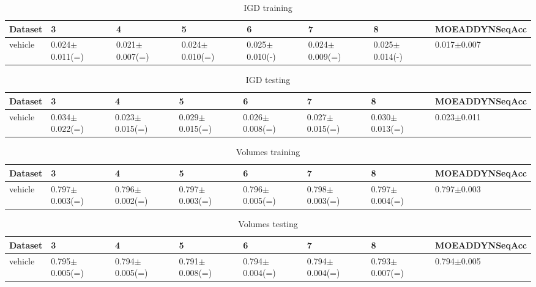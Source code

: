 \documentclass{report}
\begin{document}
\begin{table}
\centering
\scriptsize
\begin{tabular}{llllllll}
\\\hline
Dataset & 3 & 4 & 5 & 6 & 7 & 8 & MOEADDYNSeqAcc\\\hline
vehicle & 0.024$\pm$0.011(=) & 0.021$\pm$0.007(=) & 0.024$\pm$0.010(=) & 0.025$\pm$0.010(-) & 0.024$\pm$0.009(=) & 0.025$\pm$0.014(-) & 0.017$\pm$0.007\\\hline
\end{tabular}
\caption{IGD training}
\end{table}

\begin{table}
\centering
\scriptsize
\begin{tabular}{llllllll}
\\\hline
Dataset & 3 & 4 & 5 & 6 & 7 & 8 & MOEADDYNSeqAcc\\\hline
vehicle & 0.034$\pm$0.022(=) & 0.023$\pm$0.015(=) & 0.029$\pm$0.015(=) & 0.026$\pm$0.008(=) & 0.027$\pm$0.015(=) & 0.030$\pm$0.013(=) & 0.023$\pm$0.011\\\hline
\end{tabular}
\caption{IGD testing}
\end{table}

\begin{table}
\centering
\scriptsize
\begin{tabular}{llllllll}
\\\hline
Dataset & 3 & 4 & 5 & 6 & 7 & 8 & MOEADDYNSeqAcc\\\hline
vehicle & 0.797$\pm$0.003(=) & 0.796$\pm$0.002(=) & 0.797$\pm$0.003(=) & 0.796$\pm$0.005(=) & 0.798$\pm$0.003(=) & 0.797$\pm$0.004(=) & 0.797$\pm$0.003\\\hline
\end{tabular}
\caption{Volumes training}
\end{table}

\begin{table}
\centering
\scriptsize
\begin{tabular}{llllllll}
\\\hline
Dataset & 3 & 4 & 5 & 6 & 7 & 8 & MOEADDYNSeqAcc\\\hline
vehicle & 0.795$\pm$0.005(=) & 0.794$\pm$0.005(=) & 0.791$\pm$0.008(=) & 0.794$\pm$0.004(=) & 0.794$\pm$0.004(=) & 0.793$\pm$0.007(=) & 0.794$\pm$0.005\\\hline
\end{tabular}
\caption{Volumes testing}
\end{table}
\end{document}

